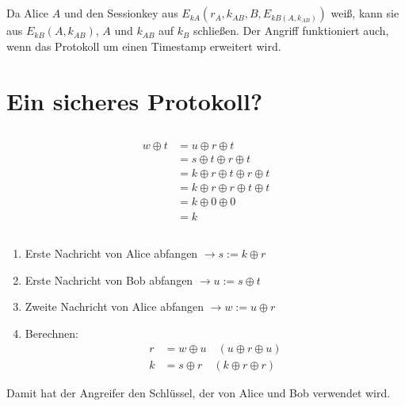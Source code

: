 \documentclass{../crypto}
\begin{document}
\subsection{}

Da Alice $A$ und den Sessionkey aus $E_{kA}(r_A,k_{AB},B,E_{kB(A,k_{AB})})$
weiß, kann sie aus $E_{kB}(A,k_{AB})$, $A$ und $k_{AB}$ auf $k_B$ schließen. Der
Angriff funktioniert auch, wenn das Protokoll um einen Timestamp erweitert wird.

\section{Ein sicheres Protokoll?}

\subsection{}
\begin{align*}
	w \oplus t & = u \oplus r \oplus t                   \\
	           & = s \oplus t \oplus r \oplus t          \\
	           & = k \oplus r \oplus t \oplus r \oplus t \\
	           & = k \oplus r \oplus r \oplus t \oplus t \\
	           & = k \oplus 0 \oplus 0                   \\
	           & = k
\end{align*}

\subsection{}

\begin{enumerate}
   \item Erste Nachricht von Alice abfangen $\rightarrow s := k \oplus r$
     \item Erste Nachricht von Bob abfangen $\rightarrow u := s \oplus t$
     \item Zweite Nachricht von Alice abfangen $\rightarrow w := u \oplus r$
     \item Berechnen: 
        \begin{align*}
           r & = w \oplus u \quad \left(u \oplus r \oplus u\right)\\
           k & = s \oplus r \quad \left(k \oplus r \oplus r\right)
        \end{align*}
\end{enumerate}
Damit hat der Angreifer den Schlüssel, der von Alice und Bob verwendet wird.
\end{document}
